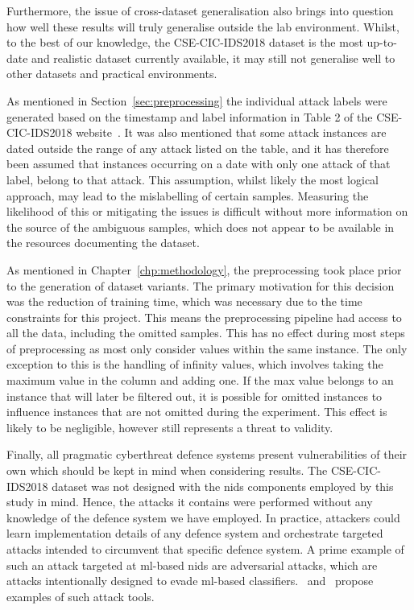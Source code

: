 Furthermore, the issue of cross-dataset generalisation also brings into
question how well these results will truly generalise outside the lab
environment. Whilst, to the best of our knowledge, the CSE-CIC-IDS2018 dataset
is the most up-to-date and realistic dataset currently available, it may still
not generalise well to other datasets and practical environments.

As mentioned in Section~\ref{sec:preprocessing} the individual attack labels
were generated based on the timestamp and label information in Table 2 of the
CSE-CIC-IDS2018 website~\cite{cic2018}. It was also mentioned that some attack
instances are dated outside the range of any attack listed on the table, and it
has therefore been assumed that instances occurring on a date with only one
attack of that label, belong to that attack. This assumption, whilst likely the
most logical approach, may lead to the mislabelling of certain samples.
Measuring the likelihood of this or mitigating the issues is difficult without
more information on the source of the ambiguous samples, which does not appear
to be available in the resources documenting the dataset.

As mentioned in Chapter~\ref{chp:methodology}, the preprocessing took place
prior to the generation of dataset variants. The primary motivation for this
decision was the reduction of training time, which was necessary due to the
time constraints for this project. This means the preprocessing pipeline had
access to all the data, including the omitted samples. This has no effect
during most steps of preprocessing as most only consider values within the same
instance. The only exception to this is the handling of infinity values, which
involves taking the maximum value in the column and adding one. If the max
value belongs to an instance that will later be filtered out, it is possible
for omitted instances to influence instances that are not omitted during the
experiment. This effect is likely to be negligible, however still represents a
threat to validity.

Finally, all pragmatic cyberthreat defence systems present vulnerabilities of
their own which should be kept in mind when considering results. The
CSE-CIC-IDS2018 dataset was not designed with the \gls{nids} components
employed by this study in mind. Hence, the attacks it contains were performed
without any knowledge of the defence system we have employed. In practice,
attackers could learn implementation details of any defence system and
orchestrate targeted attacks intended to circumvent that specific defence
system. A prime example of such an attack targeted at \gls{ml}-based \gls{nids}
are adversarial attacks, which are attacks intentionally designed to evade
\gls{ml}-based classifiers.~\cite{adversarial1} and~\cite{adversarial2} propose
examples of such attack tools.
